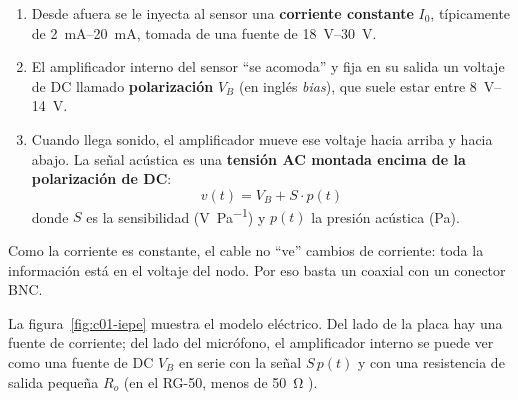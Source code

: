 \begin{idea}
\begin{enumerate}
  \item Desde afuera se le inyecta al sensor una \textbf{corriente constante} $I_0$, típicamente de \SIrange{2}{20}{\milli\ampere}, tomada de una fuente de \SIrange{18}{30}{\volt}.
  \item El amplificador interno del sensor ``se acomoda'' y fija en su salida un voltaje de DC llamado \textbf{polarización} $V_B$ (en inglés \emph{bias}), que suele estar entre \SIrange{8}{14}{\volt}.
  \item Cuando llega sonido, el amplificador mueve ese voltaje hacia arriba y hacia abajo. La señal acústica es una \textbf{tensión AC montada encima de la polarización de DC}:
  \begin{equation}
    v(t) = V_B + S\cdot p(t)
    \label{eq:c01-iepe}
  \end{equation}
  donde $S$ es la sensibilidad (\si{\volt\per\pascal}) y $p(t)$ la presión acústica (\si{\pascal}).
\end{enumerate}
Como la corriente es constante, el cable no ``ve'' cambios de corriente: toda la información está en el voltaje del nodo. Por eso basta un coaxial con un conector BNC.
\end{idea}

La figura~\ref{fig:c01-iepe} muestra el modelo eléctrico. Del lado de la placa hay una fuente de corriente; del lado del micrófono, el amplificador interno se puede ver como una fuente de DC $V_B$ en serie con la señal $S\,p(t)$ y con una resistencia de salida pequeña $R_o$ (en el RG-50, menos de \SI{50}{\ohm} ).


